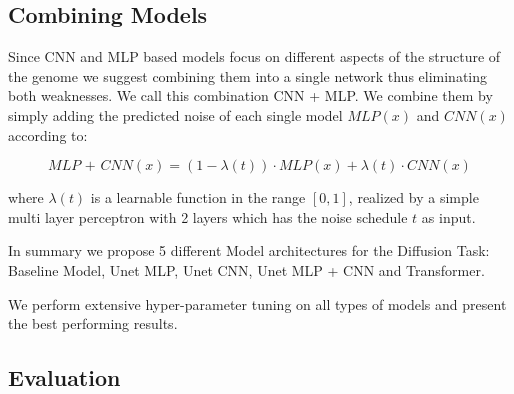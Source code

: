 \subsection{Combining Models}

Since CNN and MLP based models focus on different aspects of the structure of the genome we suggest combining them into a single network thus eliminating both weaknesses. We call this combination CNN + MLP. We combine them by simply adding the predicted noise of each single model $MLP(x)$ and $CNN(x)$ according to:

\begin{equation}
    \textit{MLP + CNN}(x) = (1-\lambda(t)) \cdot MLP(x) + \lambda(t) \cdot CNN(x)
\end{equation}

where $\lambda(t)$ is a learnable function in the range $[0,1]$, realized by a simple multi layer perceptron with 2 layers which has the noise schedule $t$ as input. %



In summary we propose 5 different Model architectures for the Diffusion Task: Baseline Model, Unet MLP, Unet CNN, Unet MLP + CNN and Transformer.


We perform extensive hyper-parameter tuning on all types of models and present the best performing results.

\subsection{Evaluation}

